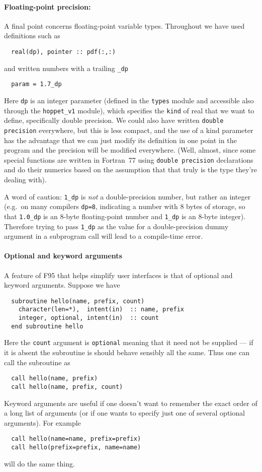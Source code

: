 \documentclass[12pt]{article}
\newcommand{\eg}{e.g.\ }
\newcommand{\ttt}[1]{\texttt{#1}}
\begin{document}
\paragraph{Floating-point precision:}
A final point concerns floating-point variable types. Throughout we
have used definitions such as
\begin{lstlisting}
  real(dp), pointer :: pdf(:,:)
\end{lstlisting}
and written numbers with a trailing \texttt{\_dp}
\begin{lstlisting}
  param = 1.7_dp
\end{lstlisting}
Here \texttt{dp} is an integer parameter (defined in the
\texttt{types} module and accessible also through the
\texttt{hoppet\_v1} module), which specifies the \texttt{kind} of real
that we want to define, specifically double precision. We could also
have written \texttt{double precision} everywhere, but this is less
compact, and the use of a kind parameter has the advantage that we
can just modify its definition in one point in the program and the
precision will be modified everywhere. (Well, almost, since some
special functions are written in Fortran~77 using \texttt{double
  precision} declarations and do their numerics based on the
assumption that that truly is the type they're dealing with).

A word of caution: \ttt{1\_dp} is \emph{not} a double-precision
number, but rather an integer (\eg on many compilers \ttt{dp=8},
indicating a number with 8 bytes of storage, so that \ttt{1.0\_dp} is
an 8-byte floating-point number and \ttt{1\_dp} is an 8-byte integer).
%
Therefore trying to pass \ttt{1\_dp} as the value for a
double-precision dummy argument in a subprogram call will lead to a
compile-time error.

\paragraph{Optional and keyword arguments}

A feature of F95 that helps simplify user interfaces is that of
optional and keyword arguments. Suppose we have
\begin{lstlisting}
  subroutine hello(name, prefix, count)
    character(len=*),  intent(in)  :: name, prefix
    integer, optional, intent(in)  :: count
  end subroutine hello
\end{lstlisting}
Here the \ttt{count} argument is \ttt{optional} meaning that it need
not be supplied --- if it is absent the subroutine is should behave
sensibly all the same. Thus one can call the subroutine as
\begin{lstlisting}
  call hello(name, prefix)
  call hello(name, prefix, count)
\end{lstlisting}
Keyword arguments are useful if one doesn't want to remember the exact
order of a long list of arguments (or if one wants to specify just one
of several optional arguments). For example
\begin{lstlisting}
  call hello(name=name, prefix=prefix)
  call hello(prefix=prefix, name=name)
\end{lstlisting}
will do the same thing.
\end{document}
